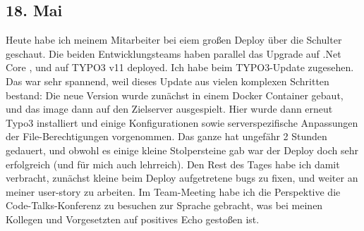 \subsection{18. Mai}
Heute habe ich meinem Mitarbeiter bei eiem großen Deploy über die Schulter geschaut. Die beiden Entwicklungsteams haben parallel das Upgrade auf .Net Core , und auf TYPO3 v11 deployed. Ich habe beim TYPO3-Update zugesehen. Das war sehr spannend, weil dieses Update aus vielen komplexen Schritten bestand: Die neue Version wurde zunächst in einem Docker Container gebaut, und das image dann auf den Zielserver ausgespielt. Hier wurde dann erneut Typo3 installiert und einige Konfigurationen sowie serverspezifische Anpassungen der File-Berechtigungen vorgenommen. Das ganze hat ungefähr 2 Stunden gedauert, und obwohl es einige kleine Stolpersteine gab war der Deploy doch sehr erfolgreich (und für mich auch lehrreich). Den Rest des Tages habe ich damit verbracht, zunächst kleine beim Deploy aufgetretene bugs zu fixen, und weiter an meiner user-story zu arbeiten.
Im Team-Meeting habe ich die Perspektive die Code-Talks-Konferenz zu besuchen zur Sprache gebracht, was bei meinen Kollegen und Vorgesetzten auf positives Echo gestoßen ist.